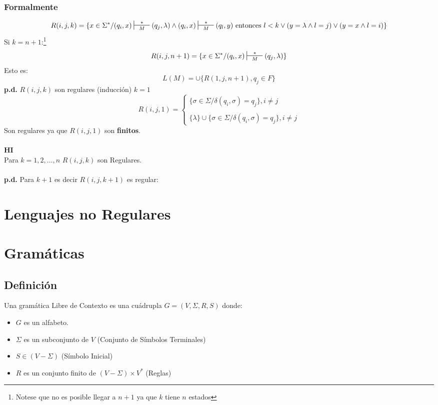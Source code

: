\begin{enumerate}
\subsubsection*{Formalmente}
$$
R(i,j,k)= \{ x\in\Sigma^* / (q_i,x)\sststile{M}{\hspace{0.25cm} * \hspace{0.25cm}} (q_j,\lambda) \wedge (q_i,x) \sststile{M}{\hspace{0.25cm} * \hspace{0.25cm}} (q_l,y) \text{ entonces } l<k \vee (y=\lambda \wedge l=j) \vee (y=x \wedge l=i) \}
$$
Si $k=n+1$:\footnote{Notese que no es posible llegar a $n+1$ ya que $k$ tiene $n$ estados}
$$
R(i,j,n+1)=\{ x\in\Sigma^* / (q_i,x) \sststile{M}{\hspace{0.25cm} * \hspace{0.25cm}} (q_j,\lambda)\}
$$
Esto es:
$$
L(M) = \cup\{ R(1,j,n+1),q_j \in F \}
$$
\textbf{p.d.} $R(i,j,k)$ son regulares (inducción) $k=1$
$$
R(i,j,1) =
\begin{cases}
\{ \sigma\in\Sigma / \delta(q_i,\sigma)=q_j \},  i\neq j \\ \\
\{\lambda \} \cup \{ \sigma\in\Sigma / \delta(q_i,\sigma)=q_j \} , i\neq j
\end{cases}
$$
Son regulares ya que $R(i,j,1)$ son \textbf{finitos}. \\${ }$\\
\textbf{HI} \\
Para $k=1,2,\ldots,n$ $R(i,j,k)$ son Regulares. \\${ }$\\
\textbf{p.d.} Para $k+1$ es decir $R(i,j,k+1)$ es regular:
\end{enumerate}
\section{Lenguajes no Regulares}
\section{Gramáticas}
\subsection{Definición}
Una gramática Libre de Contexto es una cuádrupla $G=(V,\Sigma,R,S)$ donde:
\begin{itemize}
\item $G$ es un alfabeto.
\item  $\Sigma$ es un subconjunto de $V$ (Conjunto de Símbolos Terminales)
\item $S\in (V-\Sigma)$ (Símbolo Inicial)
\item $R$ es un conjunto finito de $(V-\Sigma)\times V^*$ (Reglas)
\end{itemize}
